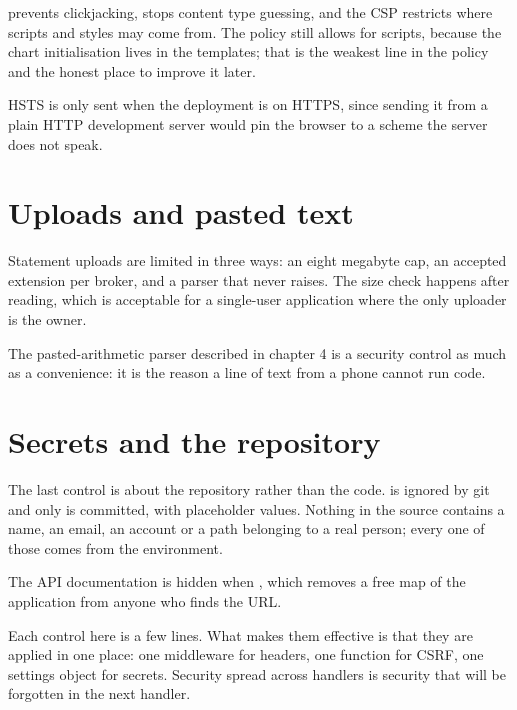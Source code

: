  prevents clickjacking,  stops content
type guessing, and the CSP restricts where scripts and styles may come from. The
policy still allows  for scripts, because the chart
initialisation lives in the templates; that is the weakest line in the policy and
the honest place to improve it later.

HSTS is only sent when the deployment is on HTTPS, since sending it from a plain
HTTP development server would pin the browser to a scheme the server does not
speak.

\section{Uploads and pasted text}

Statement uploads are limited in three ways: an eight megabyte cap, an accepted
extension per broker, and a parser that never raises. The size check happens
after reading, which is acceptable for a single-user application where the only
uploader is the owner.

The pasted-arithmetic parser described in chapter 4 is a security control as
much as a convenience: it is the reason a line of text from a phone cannot run
code.

\section{Secrets and the repository}

The last control is about the repository rather than the code.  is
ignored by git and only  is committed, with placeholder
values. Nothing in the source contains a name, an email, an account or a path
belonging to a real person; every one of those comes from the environment.

The API documentation is hidden when , which removes a free
map of the application from anyone who finds the URL.

\begin{keypoint}
Each control here is a few lines. What makes them effective is that they are
applied in one place: one middleware for headers, one function for CSRF, one
settings object for secrets. Security spread across handlers is security that
will be forgotten in the next handler.
\end{keypoint}
